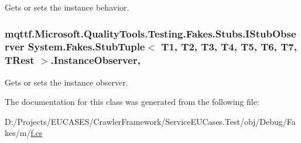 Gets or sets the instance behavior.

\hypertarget{class_system_1_1_fakes_1_1_stub_tuple_3_01_t1_00_01_t2_00_01_t3_00_01_t4_00_01_t5_00_01_t6_00_01_t7_00_01_t_rest_01_4_a3ccdfeb7a3331851e3cb42089161a18f}{
\subsubsection[{Instance\-Observer}]{\setlength{\rightskip}{0pt plus 5cm}mqttf.\-Microsoft.\-Quality\-Tools.\-Testing.\-Fakes.\-Stubs.\-I\-Stub\-Observer System.\-Fakes.\-Stub\-Tuple$<$ T1, T2, T3, T4, T5, T6, T7, T\-Rest $>$.Instance\-Observer\hspace{0.3cm}{\ttfamily [get]}, {\ttfamily [set]}}}\label{class_system_1_1_fakes_1_1_stub_tuple_3_01_t1_00_01_t2_00_01_t3_00_01_t4_00_01_t5_00_01_t6_00_01_t7_00_01_t_rest_01_4_a3ccdfeb7a3331851e3cb42089161a18f}


Gets or sets the instance observer.



The documentation for this class was generated from the following file\-:\begin{DoxyCompactItemize}
\item 
D\-:/\-Projects/\-E\-U\-C\-A\-S\-E\-S/\-Crawler\-Framework/\-Service\-E\-U\-Cases.\-Test/obj/\-Debug/\-Fakes/m/\hyperlink{m_2f_8cs}{f.\-cs}\end{DoxyCompactItemize}
